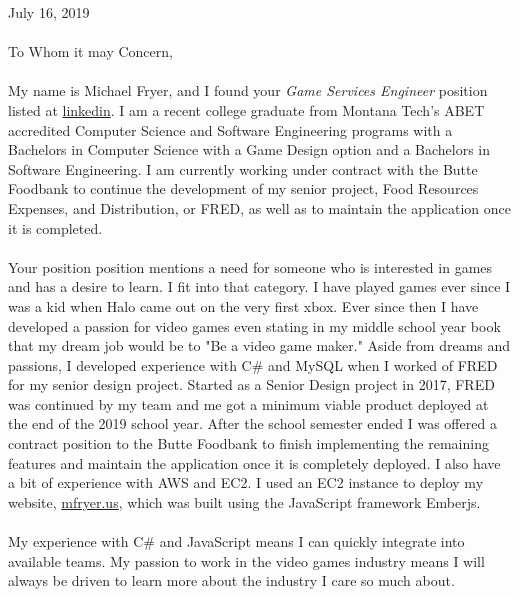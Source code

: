 July 16, 2019\\
\mbox{}\\

To Whom it may Concern,
\paragraph{}
My name is Michael Fryer, and I found your \textit{Game Services Engineer} position listed at \href{https://www.linkedin.com/jobs/view/1315865563/?refId=154ee4fc-6fe7-4709-9fcb-49e5ac42662a&trk=flagship3_search_srp_jobs}{linkedin}. I am a recent college graduate from Montana Tech's ABET accredited Computer Science and Software Engineering programs with a Bachelors in Computer Science with a Game Design option and a Bachelors in Software Engineering. I am currently working under contract with the Butte Foodbank to continue the development of my senior project, Food Resources Expenses, and Distribution, or FRED, as well as to maintain the application once it is completed.\\

\paragraph{}
Your position position mentions a need for someone who is interested in games and has a desire to learn. I fit into that category. I have played games ever since I was a kid when Halo came out on the very first xbox. Ever since then I have developed a passion for video games even stating in my middle school year book that my dream job would be to "Be a video game maker." Aside from dreams and passions, I developed experience with C\# and MySQL when I worked of FRED for my senior design project. Started as a Senior Design project in 2017, FRED was continued by my team and me got a minimum viable product deployed at the end of the 2019 school year. After the school semester ended I was offered a contract position to the Butte Foodbank to finish implementing the remaining features and maintain the application once it is completely deployed. I also have a bit of experience with AWS and EC2. I used an EC2 instance to deploy my website, \href{http://mfryer.us}{mfryer.us}, which was built using the JavaScript framework Emberjs.

\paragraph{}
My experience with C\# and JavaScript means I can quickly integrate into available teams. My passion to work in the video games industry means I will always be driven to learn more about the industry I care so much about.